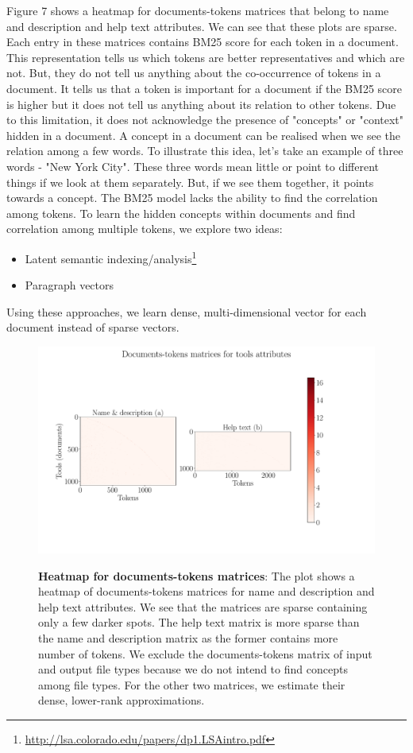 Figure 7 shows a heatmap for documents-tokens matrices that belong to name and description and help text attributes. We can see that these plots are sparse. Each entry in these matrices contains BM25 score for each token in a document. This representation tells us which tokens are better representatives and which are not. But, they do not tell us anything about the co-occurrence of tokens in a document. It tells us that a token is important for a document if the BM25 score is higher but it does not tell us anything about its relation to other tokens. Due to this limitation, it does not acknowledge the presence of "concepts" or "context" hidden in a document. A concept in a document can be realised when we see the relation among a few words. To illustrate this idea, let's take an example of three words - "New York City". These three words mean little or point to different things if we look at them separately. But, if we see them together, it points towards a concept. The BM25 model lacks the ability to find the correlation among tokens. To learn the hidden concepts within documents and find correlation among multiple tokens, we explore two ideas:
\begin{itemize}
\item Latent semantic indexing/analysis\footnote{\url{http://lsa.colorado.edu/papers/dp1.LSAintro.pdf}}
\item Paragraph vectors
\end{itemize}

Using these approaches, we learn dense, multi-dimensional vector for each document instead of sparse vectors. 

\begin{figure}[h]
\begin{centering}
    {\includegraphics[scale=0.4]{figures/Document_tokens_full_rank.pdf}}
    \caption[Heatmap for documents-tokens matrices]{\textbf{Heatmap for documents-tokens matrices}: The plot shows a heatmap of documents-tokens matrices for name and description and help text attributes. We see that the matrices are sparse containing only a few darker spots. The help text matrix is more sparse than the name and description matrix as the former contains more number of tokens. We exclude the documents-tokens matrix of input and output file types because we do not intend to find concepts among file types. For the other two matrices, we estimate their dense, lower-rank approximations.}
\end{centering}
\end{figure}

